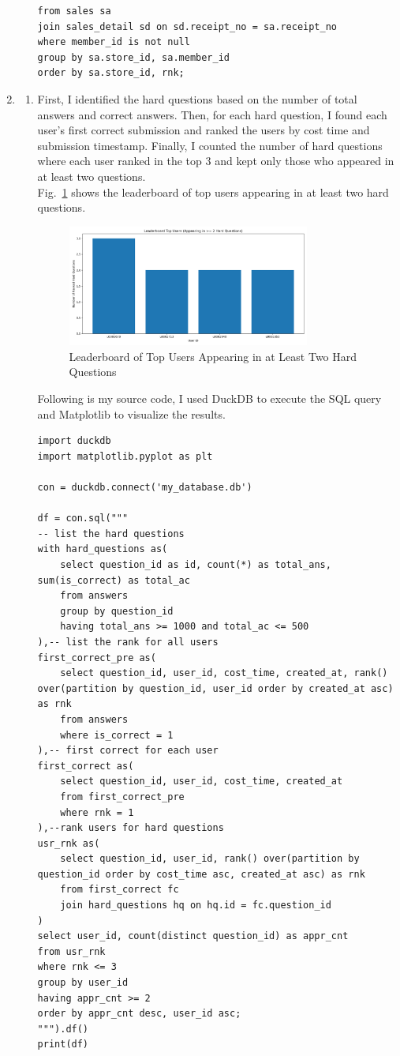 \documentclass[12pt,a4paper]{article}
\begin{document}
\begin{enumerate}
\begin{enumerate}
\begin{verbatim}
from sales sa
join sales_detail sd on sd.receipt_no = sa.receipt_no
where member_id is not null
group by sa.store_id, sa.member_id
order by sa.store_id, rnk;
        \end{verbatim}
    \end{enumerate}
    \item
    \begin{enumerate}
        \item First, I identified the hard questions based on the number of total answers and correct answers. Then, for each hard question, I found each user’s first correct submission and ranked the users by cost time and submission timestamp. Finally, I counted the number of hard questions where each user ranked in the top 3 and kept only those who appeared in at least two questions.\\
        Fig.~\ref{fig:2a} shows the leaderboard of top users appearing in at least two hard questions.
        \begin{figure}[H]
            \centering
            \includegraphics[width=0.8\textwidth]{code/2a_leaderboard.png}
            \caption{Leaderboard of Top Users Appearing in at Least Two Hard Questions}
            \label{fig:2a}
        \end{figure}
        Following is my source code, I used DuckDB to execute the SQL query and Matplotlib to visualize the results.
        \begin{verbatim}
import duckdb
import matplotlib.pyplot as plt

con = duckdb.connect('my_database.db')

df = con.sql("""
-- list the hard questions
with hard_questions as(
    select question_id as id, count(*) as total_ans, sum(is_correct) as total_ac
    from answers
    group by question_id
    having total_ans >= 1000 and total_ac <= 500
),-- list the rank for all users
first_correct_pre as(
    select question_id, user_id, cost_time, created_at, rank() over(partition by question_id, user_id order by created_at asc) as rnk
    from answers
    where is_correct = 1
),-- first correct for each user
first_correct as(
    select question_id, user_id, cost_time, created_at
    from first_correct_pre
    where rnk = 1
),--rank users for hard questions
usr_rnk as(
    select question_id, user_id, rank() over(partition by question_id order by cost_time asc, created_at asc) as rnk
    from first_correct fc
    join hard_questions hq on hq.id = fc.question_id
)
select user_id, count(distinct question_id) as appr_cnt
from usr_rnk
where rnk <= 3
group by user_id
having appr_cnt >= 2
order by appr_cnt desc, user_id asc;
""").df()
print(df)


\end{verbatim}
\end{enumerate}
\end{enumerate}
\end{document}
